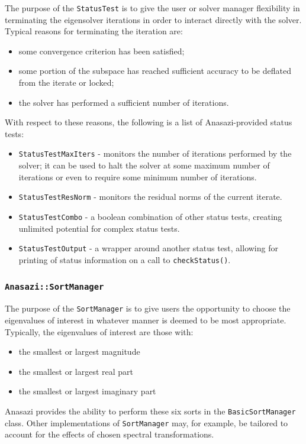 \documentclass[acmtoms]{acmtrans2m}
\newcommand{\aspace}[1]{\texttt{#1}}
\begin{document}
The purpose of the \aspace{StatusTest} is to give the user or solver
manager flexibility in terminating the eigensolver iterations in
order to interact directly with the solver. Typical
reasons for terminating the iteration are:
\begin{itemize}
  \item some convergence criterion has been satisfied;
  \item some portion of the subspace has reached sufficient accuracy to be
  deflated from the iterate or locked;
  \item the solver has performed a sufficient number of iterations.
\end{itemize}
With respect to these reasons, the following is a list of Anasazi-provided status tests:
\begin{itemize}
  \item \aspace{StatusTestMaxIters} - monitors the number of iterations
    performed by the solver; it can be used to halt the solver at some maximum number of iterations
    or even to require some minimum number of iterations.
  \item \aspace{StatusTestResNorm} - monitors the residual norms of the
    current iterate.
  \item \aspace{StatusTestCombo} - a boolean combination of
    other status tests, creating unlimited potential for complex status tests.
  \item \aspace{StatusTestOutput} - a wrapper around another
    status test, allowing for printing of status information on a call to
    \verb!checkStatus()!.
\end{itemize}

\subsubsection{\aspace{Anasazi::SortManager}}

The purpose of the \aspace{SortManager} is to give users the opportunity to choose the 
eigenvalues of interest in whatever manner is deemed to be most appropriate. 
Typically, the eigenvalues of interest are those with:
\begin{itemize}
  \item the smallest or largest magnitude
  \item the smallest or largest real part
  \item the smallest or largest imaginary part
\end{itemize}
Anasazi provides the ability to perform these six sorts in the \aspace{BasicSortManager}
class. Other implementations of \aspace{SortManager} may, for example, be tailored to
account for the effects of chosen spectral transformations.
\end{document}
